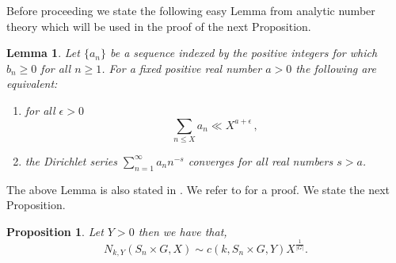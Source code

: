 \documentclass[11pt]{amsart}
\newtheorem{Lemma}[theorem]{Lemma}
\newtheorem{proposition}[theorem]{Proposition}
\numberwithin{equation}{section}
\begin{document}
Before proceeding we state the following easy Lemma from analytic number theory which will be used in the proof of the next Proposition.
\begin{Lemma}\label{ant lemma}
    Let $\{a_n\}$ be a sequence indexed by the positive integers for which $b_n \geq 0$ for all $n\geq 1$. For a fixed positive real number $a>0$ the following are equivalent:
\begin{enumerate}
\item{
for all $\epsilon>0$
\[
\sum_{n\le X} a_n \ll X^{a+\epsilon}\,,
\]
}

\item{
the Dirichlet series $\sum_{n=1}^{\infty} a_n n^{-s}$ converges for all real numbers $s>a$.
}
\end{enumerate}
\end{Lemma}
The above Lemma is also stated in \cite[Lemma 3.1]{MR4047213}. We refer to \cite{tenenbaumbook} for a proof. We state the next Proposition.
\begin{proposition}\label{bound_Y}
    Let $Y > 0$ then we have that,
    \[
    N_{k,Y}(S_n\times G, X) \sim c(k, S_n\times G, Y)X^{\frac{1}{|G|}}.
    \]
\end{proposition}
\end{document}
